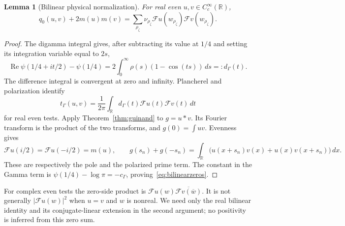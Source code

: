 \documentclass[11pt,a4paper]{article}
\numberwithin{equation}{section}
\newtheorem{lemma}[theorem]{Lemma}
\theoremstyle{remark}
\newcommand{\R}{\mathbb R}
\newcommand{\tg}{t_{\Gamma}}
\newcommand{\cg}{c_{\Gamma}}
\begin{document}
\begin{lemma}[Bilinear physical normalization]\label{lem:bilinear}
For real even $u,v\in C_c^\infty(\R)$,
\begin{equation}\label{eq:bilinearzeros}
 q_0(u,v)+2m(u)m(v)
   =\sum_{\rho_\zeta}\nu_{\rho_\zeta}
       \mathcal Fu(w_{\rho_\zeta})\mathcal Fv(w_{\rho_\zeta}).
\end{equation}
\end{lemma}
\begin{proof}
The digamma integral \cite[Eq.~5.9.16]{DLMF} gives, after subtracting its value at $1/4$ and setting its integration variable equal to $2s$,
\begin{equation}\label{eq:digammamultiplier}
 \operatorname{Re}\psi(1/4+it/2)-\psi(1/4)
    =2\int_0^\infty\rho(s)(1-\cos(ts))\,ds=:d_\Gamma(t).
\end{equation}
The difference integral is convergent at zero and infinity. Plancherel and polarization identify
\[
 \tg(u,v)=\frac1{2\pi}\int_\R
       d_\Gamma(t)\mathcal Fu(t)\mathcal Fv(t)\,dt
\]
for real even tests. Apply Theorem~\ref{thm:guinand} to $g=u*v$. Its Fourier transform is the product of the two transforms, and $g(0)=\int uv$. Evenness gives
\[
 \mathcal Fu(i/2)=\mathcal Fu(-i/2)=m(u),\qquad
 g(s_n)+g(-s_n)
  =\int_\R\bigl(u(x+s_n)v(x)+u(x)v(x+s_n)\bigr)\,dx.
\]
These are respectively the pole and the polarized prime term. The constant in the Gamma term is $\psi(1/4)-\log\pi=-\cg$, proving~\eqref{eq:bilinearzeros}.
\end{proof}

For complex even tests the zero-side product is
$\mathcal Fu(w)\overline{\mathcal Fv(\overline w)}$. It is not generally $|\mathcal Fu(w)|^2$ when $u=v$ and $w$ is nonreal. We need only the real bilinear identity and its conjugate-linear extension in the second argument; no positivity is inferred from this zero sum.
\end{document}
